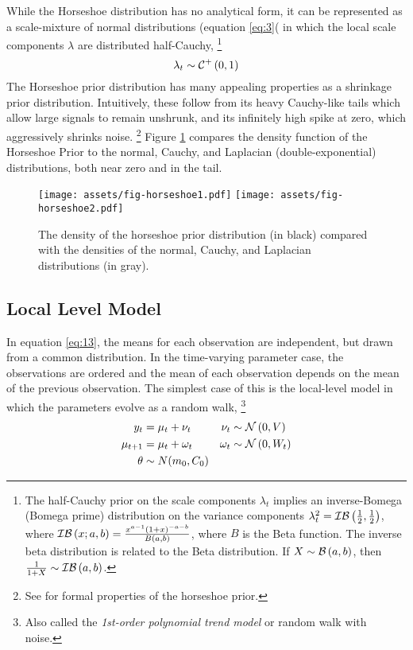 \documentclass{article}
\begin{document}
While the Horseshoe distribution has no analytical form, it can be represented as a scale-mixture of normal distributions (equation \eqref{eq:3}( in which the local scale components $\lambda$ are distributed half-Cauchy,%
\footnote{
The half-Cauchy prior on the scale components $\lambda_{t}$ implies an inverse-Bomega (Bomega prime) distribution on the variance components $\lambda_{t}^{2} = \mathcal{IB}\left(\frac{1}{2}, \frac{1}{2}\right)$, where $\mathcal{IB}\left(x; a, b\right) = \frac{x^{a - 1} (1 + x)^{-a - b}}{B(a, b)}$, where $B$ is the Beta function.
The inverse beta distribution is related to the Beta distribution.
If $X \sim \mathcal{B}\left(a, b\right)$, then $\frac{1}{1 + X} \sim \mathcal{IB}\left(a, b\right)$.
}
\begin{equation}
  \label{eq:6}
  \lambda_{t} \sim \mathcal{C}^{+}\left(0, 1\right)
\end{equation}
The Horseshoe prior distribution has many appealing properties as a shrinkage prior distribution.
Intuitively, these follow from its heavy Cauchy-like tails which allow large signals to remain unshrunk, and its infinitely high spike at zero, which aggressively shrinks noise.
\footnote{See \textcites{CarvalhoPolsonScott2010}{CarvalhoPolsonScott2009}{DattaGhosh2012} for formal properties of the horseshoe prior.}
Figure \ref{fig:horseshoe} compares the density function of the Horseshoe Prior to the normal, Cauchy, and Laplacian (double-exponential) distributions, both near zero and in the tail.
\begin{figure}
  \centering
  \texttt{[image: assets/fig-horseshoe1.pdf]}
  \texttt{[image: assets/fig-horseshoe2.pdf]}
  \caption{The density of the horseshoe prior distribution (in black) compared with the densities of the normal, Cauchy, and Laplacian distributions (in gray).}
  \label{fig:horseshoe}
\end{figure}

\subsection{Local Level Model}
\label{sec:local-level-model}

In equation \ref{eq:13}, the means for each observation are independent, but drawn from a common distribution.
In the time-varying parameter case, the observations are ordered and the mean of each observation depends on the mean of the previous observation.
The simplest case of this is the local-level model in which the parameters evolve as a random walk,
\footnote{Also called the \textit{1st-order polynomial trend model} \parencite[Chapter 2]{WestHarrison1997} or random walk with noise.}
\begin{equation}
  \label{eq:5}
  \begin{aligned}[t]
    y_{t} &= \mu_{t} + \nu_{t} & \nu_{t} & \sim \mathcal{N}\left(0, V\right) \\
    \mu_{t + 1} &= \mu_{t} + \omega_{t} & \omega_{t} & \sim \mathcal{N}\left(0, W_{t}\right) \\
    \theta & \sim N(m_{0}, C_{0})
  \end{aligned}
\end{equation}
\end{document}
